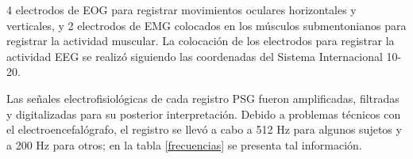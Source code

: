 4 electrodos de EOG para registrar movimientos oculares horizontales y verticales, 
y 2 electrodos de EMG colocados en los m\'usculos submentonianos para registrar la actividad 
muscular. 
La colocaci\'on de los electrodos para registrar la actividad EEG se realiz\'o siguiendo las 
coordenadas del Sistema Internacional 10-20\cite{Coleman87}.



Las se\~nales electrofisiol\'ogicas de cada registro PSG fueron amplificadas, filtradas y 
digitalizadas %
para su posterior interpretaci\'on. 
Debido a problemas t\'ecnicos con el electroencefal\'ografo, el registro se llev\'o a cabo
a 512 Hz para algunos sujetos y a 200 Hz para otros; en la tabla \ref{frecuencias}
se presenta tal informaci\'on.

